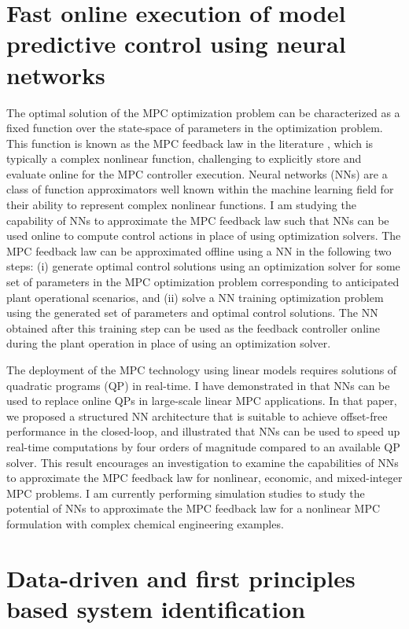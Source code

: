 \documentclass[11pt, a4paper]{article} %
\begin{document}
\section*{Fast online execution of model predictive control using neural
	networks}

The optimal solution of the MPC optimization problem can be characterized as a
fixed function over the state-space of parameters in the optimization problem.
This function is known as the MPC feedback law in the literature
\citep{bemporad:morari:dua:pistikopoulos:2002}, which is typically a complex
nonlinear function, challenging to explicitly store and evaluate online for the
MPC controller execution. Neural networks (NNs) are a class of function
approximators well known within the machine learning field for their ability to
represent complex nonlinear functions. I am studying the capability of NNs to
approximate the MPC feedback law such that NNs can be used online to compute
control actions in place of using optimization solvers. The MPC feedback law can
be approximated offline using a NN in the following two steps: (i) generate
optimal control solutions using an optimization solver for some set of
parameters in the MPC optimization problem corresponding to anticipated plant
operational scenarios, and (ii) solve a NN training optimization problem using
the generated set of parameters and optimal control solutions. The NN obtained
after this training step can be used as the feedback controller online during
the plant operation in place of using an optimization solver.

The deployment of the MPC technology using linear models requires solutions of
quadratic programs (QP) in real-time. I have demonstrated in
\cite*{kumar:rawlings:wright:2021} that NNs can be used to replace online QPs in
large-scale linear MPC applications. In that paper, we proposed a structured NN
architecture that is suitable to achieve offset-free performance in the
closed-loop, and illustrated that NNs can be used to speed up real-time
computations by four orders of magnitude compared to an available QP solver.
This result encourages an investigation to examine the capabilities of NNs to
approximate the MPC feedback law for nonlinear, economic, and mixed-integer MPC
problems. I am currently performing simulation studies to study the potential of
NNs to approximate the MPC feedback law for a nonlinear MPC formulation with
complex chemical engineering examples.

\section*{Data-driven and first principles based system identification}
\end{document}
